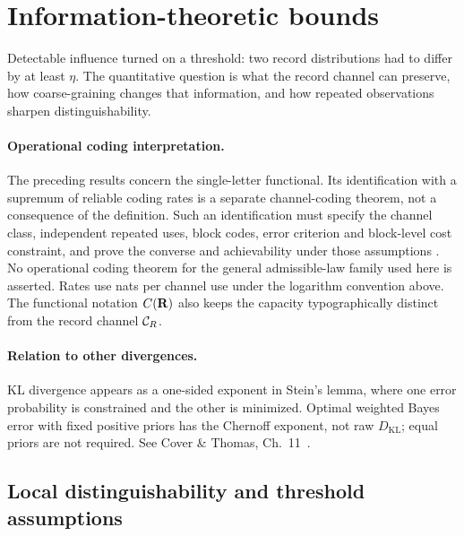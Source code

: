 \section{Information-theoretic bounds}\label{sec:information-bounds}

Detectable influence turned on a threshold: two record distributions
had to differ by at least $\eta$. The quantitative question is what
the record channel can preserve, how coarse-graining changes that
information, and how repeated observations sharpen distinguishability.



\paragraph{Operational coding interpretation.}
The preceding results concern the single-letter functional. Its
identification with a supremum of reliable coding rates is a separate
channel-coding theorem, not a consequence of the definition. Such an
identification must specify the channel class, independent repeated uses,
block codes, error criterion and block-level cost constraint, and prove
the converse and achievability under those assumptions
\cite{cover2006elements}. No operational coding theorem for the general
admissible-law family used here is asserted. Rates use nats per channel
use under the logarithm convention above. The functional notation
$C(\mathbf{R})$ also keeps the capacity
typographically distinct from the record channel $\mathcal{C}_R$.








\paragraph{Relation to other divergences.}
KL divergence appears as a one-sided exponent in Stein's lemma, where
one error probability is constrained and the other is minimized. Optimal
weighted Bayes error with fixed positive priors has the Chernoff exponent,
not raw $D_{\mathrm{KL}}$; equal priors are not required.
See Cover \& Thomas, Ch.~11~\cite{cover2006elements}.

\subsection{Local distinguishability and threshold assumptions}

